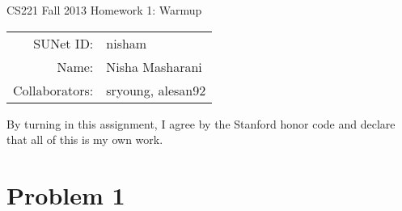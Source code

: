 \documentclass[12pt]{article}
\begin{document}
\begin{center}
{\Large CS221 Fall 2013 Homework 1: Warmup}

\begin{tabular}{rl}
SUNet ID: & nisham \\
Name: & Nisha Masharani \\
Collaborators: & sryoung, alesan92
\end{tabular}
\end{center}

By turning in this assignment, I agree by the Stanford honor code and declare
that all of this is my own work.

\section*{Problem 1}
\end{document}
